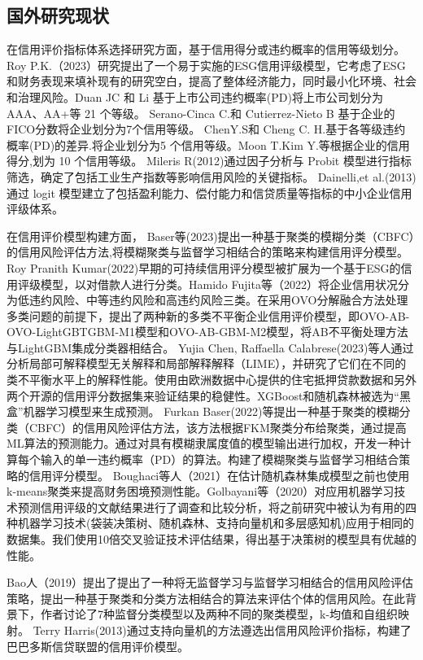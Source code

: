 \subsection{国外研究现状}
在信用评价指标体系选择研究方面，基于信用得分或违约概率的信用等级划分。Roy P.K.（2023）研究提出了一个易于实施的ESG信用评级模型，它考虑了ESG和财务表现来填补现有的研究空白，提高了整体经济能力，同时最小化环境、社会和治理风险。Duan JC 和 Li 基于上市公司违约概率(PD)将上市公司划分为 AAA、AA+等 21 个等级。
 Serano-Cinca C.和 Cutierrez-Nieto B 基于企业的 FICO分数将企业划分为7个信用等级。
ChenY.S和 Cheng C. H.基于各等级违约概率(PD)的差异.将企业划分为5 个信用等级。Moon T.Kim Y.等根据企业的信用得分,划为 10 个信用等级。
Mileris R(2012)通过因子分析与 Probit 模型进行指标筛选，确定了包括工业生产指数等影响信用风险的关键指标。
Dainelli,et al.(2013)通过 logit 模型建立了包括盈利能力、偿付能力和信贷质量等指标的中小企业信用评级体系。

在信用评价模型构建方面，
Baser等(2023)提出一种基于聚类的模糊分类（CBFC）的信用风险评估方法,将模糊聚类与监督学习相结合的策略来构建信用评分模型。Roy Pranith Kumar(2022)早期的可持续信用评分模型被扩展为一个基于ESG的信用评级模型，以对借款人进行分类。Hamido Fujita等（2022）将企业信用状况分为低违约风险、中等违约风险和高违约风险三类。在采用OVO分解融合方法处理多类问题的前提下，提出了两种新的多类不平衡企业信用评价模型，即OVO-AB-OVO-LightGBTGBM-M1模型和OVO-AB-GBM-M2模型，将AB不平衡处理方法与LightGBM集成分类器相结合。
Yujia Chen, Raffaella Calabrese(2023)等人通过分析局部可解释模型无关解释和局部解释解释（LIME），并研究了它们在不同的类不平衡水平上的解释性能。使用由欧洲数据中心提供的住宅抵押贷款数据和另外两个开源的信用评分数据集来验证结果的稳健性。XGBoost和随机森林被选为“黑盒”机器学习模型来生成预测。
Furkan Baser(2022)等提出一种基于聚类的模糊分类（CBFC）的信用风险评估方法，该方法根据FKM聚类分布给聚类，通过提高ML算法的预测能力。通过对具有模糊隶属度值的模型输出进行加权，开发一种计算每个输入的单一违约概率（PD）的算法。构建了模糊聚类与监督学习相结合策略的信用评分模型。
Boughaci等人（2021）在估计随机森林集成模型之前也使用k-means聚类来提高财务困境预测性能。Golbayani等（2020）对应用机器学习技术预测信用评级的文献结果进行了调查和比较分析，将之前研究中被认为有用的四种机器学习技术(袋装决策树、随机森林、支持向量机和多层感知机)应用于相同的数据集。我们使用10倍交叉验证技术评估结果，得出基于决策树的模型具有优越的性能。

Bao人（2019）提出了提出了一种将无监督学习与监督学习相结合的信用风险评估策略，提出一种基于聚类和分类方法相结合的算法来评估个体的信用风险。在此背景下，作者讨论了7种监督分类模型以及两种不同的聚类模型，k-均值和自组织映射。
Terry Harris(2013)通过支持向量机的方法遵选出信用风险评价指标，构建了巴巴多斯信贷联盟的信用评价模型。


